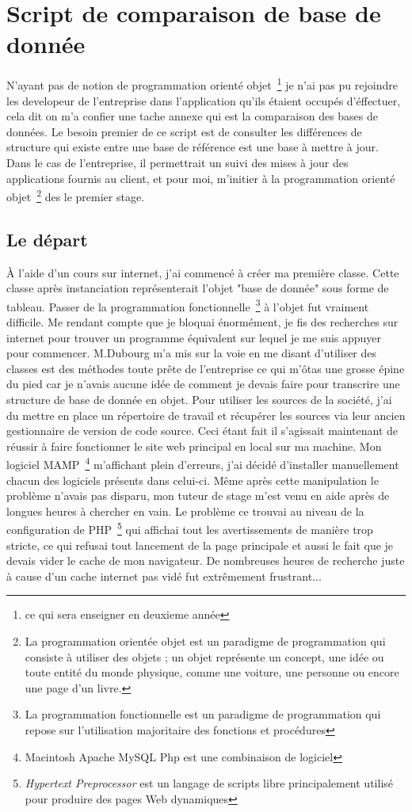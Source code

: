 \chapter{Script de comparaison de base de donnée}

N'ayant pas de notion de programmation orienté objet\, \footnote{ce qui sera
enseigner en deuxieme année} je n'ai pas pu rejoindre les developeur de
l'entreprise dans l'application qu'ils étaient occupés d'éffectuer, cela dit on
m'a confier une tache annexe qui est la comparaison des bases de données. Le
besoin premier de ce script est de consulter les différences de structure qui
existe entre une base de référence est une base à mettre à jour. Dans le cas de
l'entreprise, il permettrait un suivi des mises à jour des applications fournis
au client, et pour moi, m'initier à la programmation orienté objet\,
\footnote{La programmation orientée objet est un paradigme de programmation qui
consiste à utiliser des objets ; un objet représente un concept, une idée ou
toute entité du monde physique, comme une voiture, une personne ou encore une
page d'un livre.} des le premier stage.

\section{Le départ}

À l'aide d'un cours sur internet, j'ai commencé à créer ma première classe.
Cette classe après instanciation représenterait l'objet "base de donnée" sous
forme de tableau.  Passer de la programmation fonctionnelle\,
\footnote{La programmation fonctionnelle est un paradigme de
programmation qui repose sur l'utilisation majoritaire des fonctions et
procédures} à l'objet fut vraiment difficile. Me rendant compte que je bloquai
énormément, je fis des recherches sur internet pour trouver un programme
équivalent sur lequel je me suis appuyer pour commencer. M.Dubourg m'a mis sur
la voie en me disant d'utiliser des classes est des méthodes toute prête de
l'entreprise ce qui m'ôtas une grosse épine du pied car je n'avais aucune idée
de comment je devais faire pour transcrire une structure de base de donnée en
objet. Pour utiliser les sources de la société, j'ai du mettre en place un
répertoire de travail et récupérer les sources via leur ancien gestionnaire de
version de code source.  Ceci étant fait il s'agissait maintenant de réussir à
faire fonctionner le site web principal en local sur ma machine. Mon logiciel
MAMP\, \footnote{Macintosh Apache MySQL Php est une combinaison de logiciel}
m'affichant plein d'erreurs, j'ai décidé d'installer manuellement chacun des
logiciels présents dans celui-ci.  Même après cette manipulation le problème
n'avais pas disparu, mon tuteur de stage m'est venu en aide après de longues
heures à chercher en vain.  Le problème ce trouvai au niveau de la
configuration de PHP\, \footnote{\emph{Hypertext Preprocessor} est un langage
de scripts libre principalement utilisé pour produire des pages Web dynamiques}
qui affichai tout les avertissements de manière trop stricte, ce qui refusai
tout lancement de la page principale et aussi le fait que je devais vider le
cache de mon navigateur. De nombreuses heures de recherche juste à cause d'un
cache internet pas vidé fut extrêmement frustrant...

